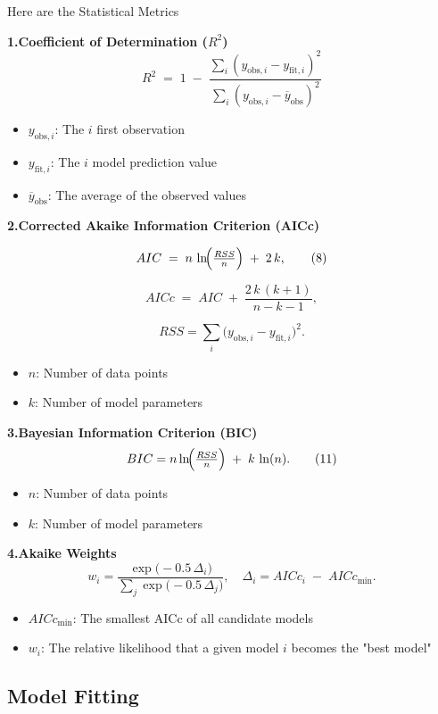 \documentclass{article}
\begin{document}
Here are the Statistical Metrics

\noindent \textbf{1.\;Coefficient of Determination ($R^2$)}
\[
R^2 \;=\; 1 \;-\; \frac{\sum\limits_{i}(y_{\mathrm{obs},i} - y_{\mathrm{fit},i})^2}
{\sum\limits_{i}(y_{\mathrm{obs},i} - \overline{y}_{\mathrm{obs}})^2} \tag{7}
\]
\begin{itemize}
  \item $y_{\mathrm{obs},i}$: The $i$ first observation
  \item $y_{\mathrm{fit},i}$: The $i$ model prediction value
  \item $\overline{y}_{\mathrm{obs}}$: The average of the observed values

\end{itemize}

\noindent \textbf{2.\;Corrected Akaike Information Criterion (AICc)}

\[
AIC \;=\; n\,\ln\!\Bigl(\tfrac{RSS}{n}\Bigr) \;+\; 2\,k, \tag{8}
\]

\[
AICc \;=\; AIC \;+\; \frac{2\,k\,(k+1)}{n - k - 1}, \tag{9}
\]

\[
RSS = \sum_{i}\bigl(y_{\mathrm{obs},i} - y_{\mathrm{fit},i}\bigr)^2. \tag{10}
\]
\begin{itemize}
  \item $n$: Number of data points
  \item $k$: Number of model parameters
\end{itemize}

\noindent \textbf{3.\;Bayesian Information Criterion (BIC)}
\[
BIC = n \ln \!\Bigl(\tfrac{RSS}{n}\Bigr) \;+\; k\,\ln(n). \tag{11}
\]
\begin{itemize}
  \item $n$: Number of data points
  \item $k$: Number of model parameters
\end{itemize}

\noindent \textbf{4.\;Akaike Weights}
\[
w_i = \frac{\exp\bigl(-0.5\,\Delta_i\bigr)}{\sum_j \exp\bigl(-0.5\,\Delta_j\bigr)},
\quad
\Delta_i = AICc_i \;-\; AICc_{\min}. \tag{12}
\]
\begin{itemize}
  \item $AICc_{\min}$: The smallest AICc of all candidate models
  \item $w_i$: The relative likelihood that a given model $i$ becomes the "best model"
\end{itemize}


\subsection{Model Fitting}
\end{document}
